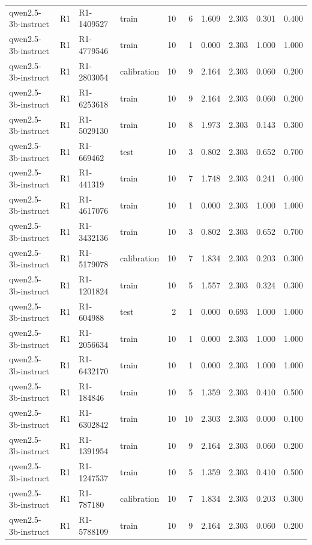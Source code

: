 \begin{table}
\begin{tabular}{llllrrrrrr}
qwen2.5-3b-instruct & R1 & R1-1409527 & train & 10 & 6 & 1.609 & 2.303 & 0.301 & 0.400 \\
qwen2.5-3b-instruct & R1 & R1-4779546 & train & 10 & 1 & 0.000 & 2.303 & 1.000 & 1.000 \\
qwen2.5-3b-instruct & R1 & R1-2803054 & calibration & 10 & 9 & 2.164 & 2.303 & 0.060 & 0.200 \\
qwen2.5-3b-instruct & R1 & R1-6253618 & train & 10 & 9 & 2.164 & 2.303 & 0.060 & 0.200 \\
qwen2.5-3b-instruct & R1 & R1-5029130 & train & 10 & 8 & 1.973 & 2.303 & 0.143 & 0.300 \\
qwen2.5-3b-instruct & R1 & R1-669462 & test & 10 & 3 & 0.802 & 2.303 & 0.652 & 0.700 \\
qwen2.5-3b-instruct & R1 & R1-441319 & train & 10 & 7 & 1.748 & 2.303 & 0.241 & 0.400 \\
qwen2.5-3b-instruct & R1 & R1-4617076 & train & 10 & 1 & 0.000 & 2.303 & 1.000 & 1.000 \\
qwen2.5-3b-instruct & R1 & R1-3432136 & train & 10 & 3 & 0.802 & 2.303 & 0.652 & 0.700 \\
qwen2.5-3b-instruct & R1 & R1-5179078 & calibration & 10 & 7 & 1.834 & 2.303 & 0.203 & 0.300 \\
qwen2.5-3b-instruct & R1 & R1-1201824 & train & 10 & 5 & 1.557 & 2.303 & 0.324 & 0.300 \\
qwen2.5-3b-instruct & R1 & R1-604988 & test & 2 & 1 & 0.000 & 0.693 & 1.000 & 1.000 \\
qwen2.5-3b-instruct & R1 & R1-2056634 & train & 10 & 1 & 0.000 & 2.303 & 1.000 & 1.000 \\
qwen2.5-3b-instruct & R1 & R1-6432170 & train & 10 & 1 & 0.000 & 2.303 & 1.000 & 1.000 \\
qwen2.5-3b-instruct & R1 & R1-184846 & train & 10 & 5 & 1.359 & 2.303 & 0.410 & 0.500 \\
qwen2.5-3b-instruct & R1 & R1-6302842 & train & 10 & 10 & 2.303 & 2.303 & 0.000 & 0.100 \\
qwen2.5-3b-instruct & R1 & R1-1391954 & train & 10 & 9 & 2.164 & 2.303 & 0.060 & 0.200 \\
qwen2.5-3b-instruct & R1 & R1-1247537 & train & 10 & 5 & 1.359 & 2.303 & 0.410 & 0.500 \\
qwen2.5-3b-instruct & R1 & R1-787180 & calibration & 10 & 7 & 1.834 & 2.303 & 0.203 & 0.300 \\
qwen2.5-3b-instruct & R1 & R1-5788109 & train & 10 & 9 & 2.164 & 2.303 & 0.060 & 0.200 \\

\end{tabular}
\end{table}
